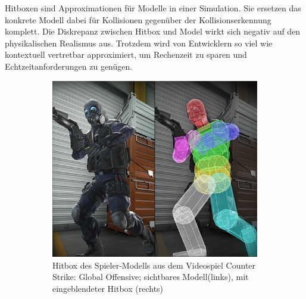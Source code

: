 \label{sec:hitbox}
Hitboxen sind Approximationen für Modelle in einer Simulation. Sie ersetzen das konkrete Modell dabei für Kollisionen gegenüber der Kollisionserkennung komplett. Die Diskrepanz zwischen Hitbox und Model wirkt sich negativ auf den physikalischen Realismus aus. Trotzdem wird von Entwicklern so viel wie kontextuell vertretbar approximiert, um Rechenzeit zu sparen und Echtzeitanforderungen zu genügen.

\begin{figure}
	\begin{subfigure}[t]{0.45\textwidth}
		\centering
		\includegraphics[width=1\textwidth]{./res/csgo_hitbox.png}
		\caption{Hitbox des Spieler-Modells aus dem Videospiel Counter Strike: Global Offensive; sichtbares Modell(links), mit eingeblendeter Hitbox (rechts)}
		\label{fig:chitbox}
	\end{subfigure}
~
	\begin{subfigure}[t]{0.2\textwidth}
		\centering

\end{subfigure}
\end{figure}

